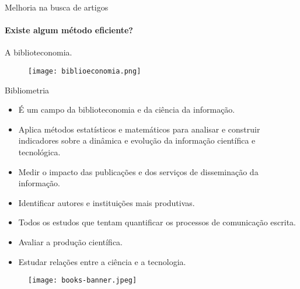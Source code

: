 \begin{frame}[t]{Melhoria na busca de artigos}
    \framesubtitle{Existe algum método eficiente?}
    A biblioteconomia.

    \begin{figure}
        \texttt{[image: biblioeconomia.png]}
    \end{figure}
\end{frame}
\begin{frame}[t]{Bibliometria}
    \begin{itemize}
        \item É um campo da biblioteconomia e da ciência da informação.
        \item Aplica métodos estatísticos e matemáticos para analisar e construir indicadores sobre a dinâmica e evolução da informação científica e tecnológica.
        \item Medir o impacto das publicações e dos serviços de disseminação da informação.
        \item Identificar autores e instituições mais produtivas.
        \item Todos os estudos que tentam quantificar os processos de comunicação escrita. \cite{pritchard1969statistical}
        \item Avaliar a produção científica. \cite{costa2020ciencia}
        \item Estudar relações entre a ciência e a tecnologia. \cite{maricato2010dinamica}
    \end{itemize}

    \begin{figure}
        \texttt{[image: books-banner.jpeg]}
    \end{figure}
   
\end{frame}
